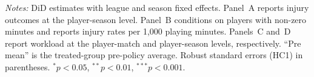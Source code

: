 \begin{table}[htbp]
\begin{threeparttable}
\begin{tabular}{lccccc}
\bottomrule
\end{tabular}
\begin{tablenotes}[flushleft]
\footnotesize
\item \textit{Notes:} DiD estimates with league and season fixed effects.
Panel~A reports injury outcomes at the player-season level.
Panel~B conditions on players with non-zero minutes and reports
injury rates per 1,000 playing minutes.
Panels~C and~D report workload at the player-match and player-season
levels, respectively. ``Pre mean'' is the treated-group pre-policy average.
Robust standard errors (HC1) in parentheses.
$^{*}p<0.05$, $^{**}p<0.01$, $^{***}p<0.001$.
\end{tablenotes}
\end{threeparttable}
\end{table}